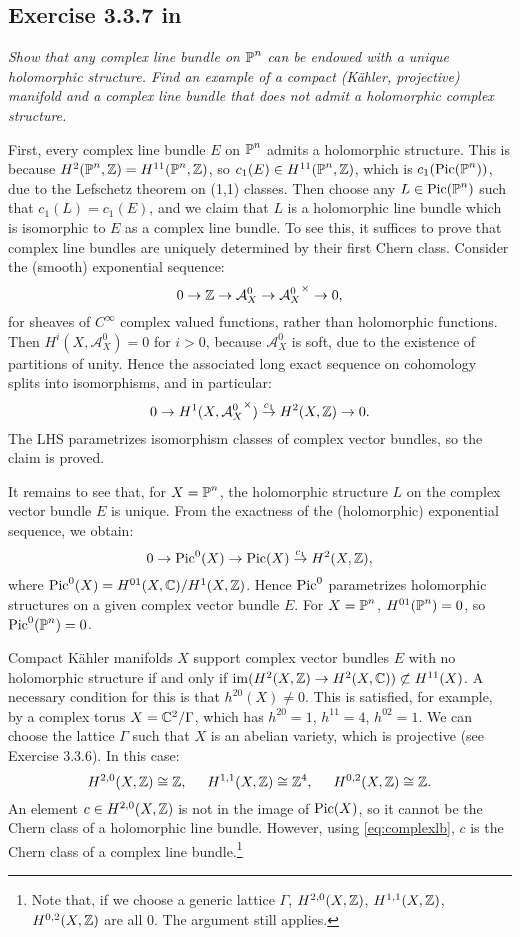 \documentclass{article}
\begin{document}
\subsection*{Exercise 3.3.7 in \cite{Huy}}
\emph{Show that any complex line bundle on $\operatorname{\mathbb{P}}^n$ can be endowed with a unique
holomorphic structure. Find an example of a compact (K\"{a}hler, projective) manifold
and a complex line bundle that does not admit a holomorphic complex structure.}
\vspace{3mm}

First, every complex line bundle $E$ on $\operatorname{\mathbb{P}}^n$ admits a holomorphic structure. This is because $H^2(\operatorname{\mathbb{P}}^n,\mathbb{Z}) = 
H^{11}(\operatorname{\mathbb{P}}^n,\mathbb{Z})$, so $c_1(E) \in H^{11}(\operatorname{\mathbb{P}}^n,\mathbb{Z})$, which is $c_1(\operatorname{Pic}(\operatorname{\mathbb{P}}^n))$,
due to the Lefschetz theorem on (1,1) classes. Then choose any $L\in \operatorname{Pic}(\operatorname{\mathbb{P}}^n)$ such that $c_1(L) = c_1(E)$, and
we claim that $L$ is a holomorphic line bundle which is isomorphic to $E$ as a complex line bundle. To see this, it
suffices to prove that complex line bundles are uniquely determined by their first Chern class. Consider the (smooth)
exponential sequence:
\[	0 \to \mathbb{Z} \to \mathcal{A}^0_X \to {\mathcal{A}^0_X}^{\times} \to 0,	\]
for sheaves of $C^{\infty}$ complex valued functions, rather than holomorphic functions. Then $H^i(X,\mathcal{A}^0_X) = 0$
for $i>0$, because $\mathcal{A}^0_X$ is soft, due to the existence of partitions of unity. Hence the associated long
exact sequence on cohomology splits into isomorphisms, and in particular:
\begin{equation}
\label{eq:complexlb}
0 \to 	H^1(X,{\mathcal{A}^0_X}^{\times}) \overset{c_1}{\to} H^2(X,\mathbb{Z}) \to 0.
\end{equation}
The LHS parametrizes isomorphism classes of complex vector bundles, so the claim is proved.

It remains to see that, for $X = \operatorname{\mathbb{P}}^n$, the holomorphic structure $L$ on the complex vector bundle $E$ is unique. From
the exactness of the (holomorphic) exponential sequence, we obtain:
\[	0 \to \operatorname{Pic}^0(X) \to \operatorname{Pic}(X) \overset{c_1}{\to} H^2(X,\mathbb{Z}), 	\]
where $\operatorname{Pic}^0(X) = H^{01}(X,\mathbb{C}) / H^1(X,\mathbb{Z})$. Hence $\operatorname{Pic}^0$ parametrizes holomorphic structures on a given complex
vector bundle $E$. For $X = \operatorname{\mathbb{P}}^n$, $H^{01}(\operatorname{\mathbb{P}}^n) = 0$, so $\operatorname{Pic}^0(\operatorname{\mathbb{P}}^n) = 0$. 

Compact K\"{a}hler manifolds $X$ support complex vector bundles $E$ with no holomorphic structure if and only if
$\operatorname{im}(H^2(X,\mathbb{Z}) \to H^2(X,\mathbb{C})) \not \subset H^{11}(X)$. A necessary condition for this is that $h^{20}(X) \neq 0$.
This is satisfied, for example, by a complex torus $X =\mathbb{C}^2/\Gamma$, which has $h^{20} = 1$, $h^{11} = 4$, $h^{02} = 1$.
We can choose the lattice $\Gamma$ such that $X$ is an abelian variety, which is projective (see Exercise 3.3.6).
In this case:
\[	H^{2,0}(X,\mathbb{Z}) \cong \mathbb{Z}, \hspace{5mm} H^{1,1}(X,\mathbb{Z}) \cong \mathbb{Z}^4, \hspace{5mm} H^{0,2}(X,\mathbb{Z}) \cong \mathbb{Z}.	\]
An element $c \in H^{2,0}(X,\mathbb{Z})$ is not in the image of $\operatorname{Pic}(X)$, so it cannot be the Chern class of a holomorphic
line bundle. However, using \ref{eq:complexlb}, $c$ is the Chern class of a complex line bundle.\footnote{Note that,
if we choose a generic lattice $\Gamma$, $H^{2,0}(X,\mathbb{Z})$, $H^{1,1}(X,\mathbb{Z})$, $H^{0,2}(X,\mathbb{Z})$ are all 0. The argument
still applies.}
\end{document}
